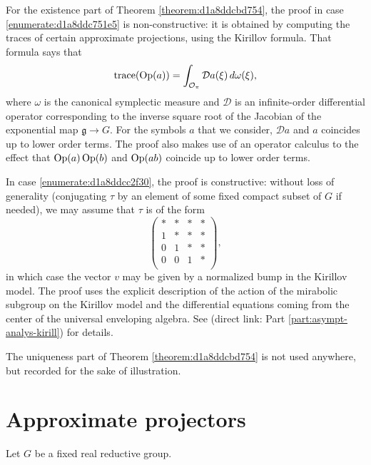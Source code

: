 \documentclass[reqno]{amsart} 
\numberwithin{equation}{section}
\numberwithin{theorem}{section}
\begin{document}
\begin{remark}
  For the existence part of Theorem \ref{theorem:d1a8ddcbd754}, the proof in case \eqref{enumerate:d1a8ddc751e5} is non-constructive: it is obtained by computing the traces of certain approximate projections, using the Kirillov formula.  That formula says that
  \begin{equation*}
\operatorname{trace}(\operatorname{Op}(a)) = \int_{\mathcal{O}_\pi } \mathcal{D} a(\xi) \, d \omega(\xi),
\end{equation*}
where $\omega$ is the canonical symplectic measure and $\mathcal{D}$ is an infinite-order differential operator corresponding to the inverse square root of the Jacobian of the exponential map $\mathfrak{g} \rightarrow G$.  For the symbols $a$ that we consider, $\mathcal{D} a$ and $a$ coincides up to lower order terms.  The proof also makes use of an operator calculus to the effect that $\operatorname{Op}(a) \operatorname{Op}(b)$ and $\operatorname{Op}(a b)$ coincide up to lower order terms.

  In case \eqref{enumerate:d1a8ddcc2f30}, the proof is constructive: without loss of generality (conjugating $\tau$ by an element of some fixed compact subset of $G$ if needed), we may assume that $\tau$ is of the form
\begin{equation*}
\begin{pmatrix}
\ast & \ast & \ast & \ast \\
1 & \ast & \ast & \ast \\
0 & 1 & \ast & \ast \\
0 & 0 & 1 & \ast \\
\end{pmatrix},
\end{equation*}
in which case the vector $v$ may be given by a normalized bump in the Kirillov model.  The proof uses the explicit description of the action of the mirabolic subgroup on the Kirillov model and the differential equations coming from the center of the universal enveloping algebra.  See \cite[Part 3]{2021arXiv210915230N} (direct link: Part \ref{part:asympt-analys-kirill}) for details.

The uniqueness part of Theorem \ref{theorem:d1a8ddcbd754} is not used anywhere, but recorded for the sake of illustration.
\end{remark}

\section{Approximate projectors}\label{sec:d1a8de6154ce}
Let $G$ be a fixed real reductive group.
\end{document}
